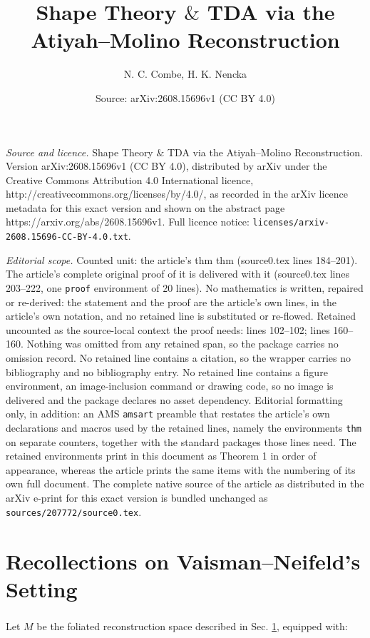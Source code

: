 \documentclass[10pt,a4paper]{amsart}
\title{Shape Theory $\&$ TDA via the Atiyah--Molino Reconstruction}
\author{N. C. Combe, H. K. Nencka}
\date{Source: arXiv:2608.15696v1 (CC BY 4.0)}
\begin{document}
\maketitle

\noindent\emph{Source and licence.} Shape Theory $\&$ TDA via the Atiyah--Molino Reconstruction. Version arXiv:2608.15696v1 (CC BY 4.0), distributed by arXiv under the Creative Commons Attribution 4.0 International licence, http://creativecommons.org/licenses/by/4.0/, as recorded in the arXiv licence metadata for this exact version and shown on the abstract page https://arxiv.org/abs/2608.15696v1. Full licence notice: \texttt{licenses/arxiv-2608.15696-CC-BY-4.0.txt}.\par\smallskip

\noindent\textit{Editorial scope.} Counted unit: the article's thm thm (source0.tex lines 184--201). The article's complete original proof of it is delivered with it (source0.tex lines 203--222, one \texttt{proof} environment of 20 lines). No mathematics is written, repaired or re-derived: the statement and the proof are the article's own lines, in the article's own notation, and no retained line is substituted or re-flowed.  Retained uncounted as the source-local context the proof needs: lines 102--102; lines 160--160.  Nothing was omitted from any retained span, so the package carries no omission record.  No retained line contains a citation, so the wrapper carries no bibliography and no bibliography entry.  No retained line contains a figure environment, an image-inclusion command or drawing code, so no image is delivered and the package declares no asset dependency.  Editorial formatting only, in addition: an AMS \texttt{amsart} preamble that restates the article's own declarations and macros used by the retained lines, namely the environments \texttt{thm} on separate counters, together with the standard packages those lines need.  The retained environments print in this document as Theorem 1 in order of appearance, whereas the article prints the same items with the numbering of its own full document.  The complete native source of the article as distributed in the arXiv e-print for this exact version is bundled unchanged as \texttt{sources/207772/source0.tex}.
\section{Recollections on Vaisman--Neifeld's Setting}\label{S:VN}

\subsubsection{}\label{S:QNI} Let \( M \) be the foliated reconstruction space described in Sec. \ref{S:VN}, equipped with:
\end{document}

